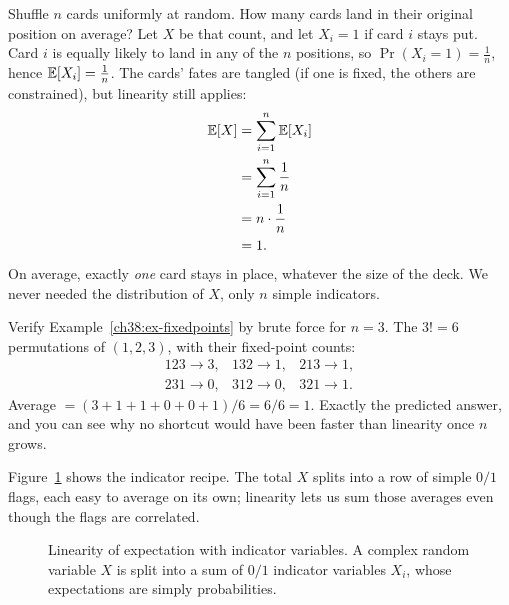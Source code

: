 \begin{example}
\label{ch38:ex-fixedpoints}
Shuffle $n$ cards uniformly at random. How many cards land in their original position
on average? Let $X$ be that count, and let $X_i = 1$ if card $i$ stays put. Card $i$ is
equally likely to land in any of the $n$ positions, so $\Pr(X_i = 1) = \tfrac1n$, hence
$\mathbb{E}[X_i] = \tfrac1n$. The cards' fates are tangled (if one is fixed, the others are
constrained), but linearity still applies:
\begin{align*}
\mathbb{E}[X] &= \sum_{i=1}^{n} \mathbb{E}[X_i] \\
&= \sum_{i=1}^{n} \frac1n \\
&= n \cdot \frac1n \\
&= 1.
\end{align*}
On average, exactly \emph{one} card stays in place, whatever the size of the deck. We
never needed the distribution of $X$, only $n$ simple indicators.
\end{example}

\begin{labbox}
Verify Example~\ref{ch38:ex-fixedpoints} by brute force for $n = 3$. The $3! = 6$
permutations of $(1,2,3)$, with their fixed-point counts:
\[
\begin{array}{llll}
123 \to 3, & 132 \to 1, & 213 \to 1, \\
231 \to 0, & 312 \to 0, & 321 \to 1.
\end{array}
\]
Average $= (3 + 1 + 1 + 0 + 0 + 1)/6 = 6/6 = 1$. Exactly the predicted answer, and you
can see why no shortcut would have been faster than linearity once $n$ grows.
\end{labbox}

Figure~\ref{fig:linearity} shows the indicator recipe. The total $X$ splits into a row of
simple $0/1$ flags, each easy to average on its own; linearity lets us sum those
averages even though the flags are correlated.

\begin{figure}[htbp]
\centering
{}
\caption{Linearity of expectation with indicator variables. A complex random variable $X$ is split into a sum of $0/1$ indicator variables $X_i$, whose expectations are simply probabilities.}
\label{fig:linearity}
\end{figure}

